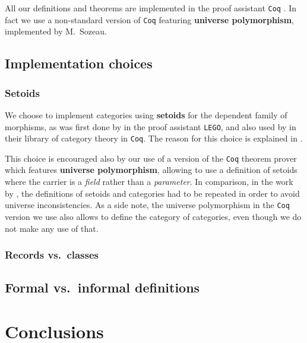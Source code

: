 \documentclass{amsart}
\newcommand{\fat}[1]{\textbf{#1}}
\begin{document}
All our definitions and theorems are implemented in the proof assistant \texttt{Coq} \parencite{coq}.
In fact we use a non-standard version of \texttt{Coq} featuring \fat{universe polymorphism}, implemented by 
M.\ Sozeau.

\subsection{Implementation choices}


\subsubsection{Setoids}

We choose to implement categories using \fat{setoids} for the dependent family of morphisms, as was first done by
\textcite{aczel_galois} in the proof assistant \texttt{LEGO}, and also used by \textcite{concat} in their library
of category theory in \texttt{Coq}.
The reason for this choice is explained in \parencite[Sec.\ 3.1.2]{ahrens_zsido}.

This choice is encouraged also by our use of a version of the \texttt{Coq} theorem prover which features \fat{universe polymorphism},
allowing to use a definition of setoids where the carrier is a \emph{field} rather than a \emph{parameter}.
In comparison, in the work by \textcite{concat}, the definitions of setoids and categories had to be repeated in order to avoid
universe inconsistencies.
As a side note, the universe polymorphism in the \texttt{Coq} version we use also allows to define the category of categories, even though
we do not make any use of that.

\subsubsection{Records vs.\ classes}

\subsection{Formal vs.\ informal definitions}


\section{Conclusions}



\printbibliography

\appendix


\end{document}
